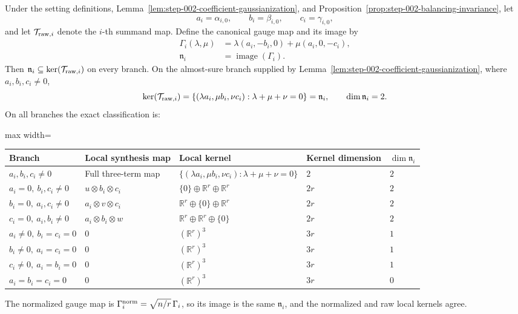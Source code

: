 \begin{lemma}
\label{lem:step-005-gauge-kernel}
Under the setting definitions, Lemma~\ref{lem:step-002-coefficient-gaussianization}, and Proposition~\ref{prop:step-002-balancing-invariance}, let
\[
  a_i=\alpha_{i,0},\qquad b_i=\beta_{i,0},\qquad c_i=\gamma_{i,0},
\]
and let \(\mathcal T_{{\rm raw},i}\) denote the \(i\)-th summand map. Define
the canonical gauge map and its image by
\[
\begin{aligned}
  \Gamma_i(\lambda,\mu)
  &=\lambda(a_i,-b_i,0)+\mu(a_i,0,-c_i),\\
  \mathfrak n_i&=\operatorname{image}(\Gamma_i).
\end{aligned}
\]
Then \(\mathfrak n_i\subseteq\ker(\mathcal T_{{\rm raw},i})\) on every
branch. On the almost-sure branch supplied by
Lemma~\ref{lem:step-002-coefficient-gaussianization}, where
\(a_i,b_i,c_i\ne0\),
\[
  \ker(\mathcal T_{{\rm raw},i})
  =\{(\lambda a_i,\mu b_i,\nu c_i):\lambda+\mu+\nu=0\}
  =\mathfrak n_i,\qquad \dim\mathfrak n_i=2.
\]
On all branches the exact classification is:

\begin{center}
\small
\begin{adjustbox}{max width=\textwidth}
\begin{tabular}{lllll}
\hline
Branch & Local synthesis map & Local kernel & Kernel dimension & \(\dim\mathfrak n_i\) \\
\hline
\(a_i,b_i,c_i\ne0\) & Full three-term map & \(\{(\lambda a_i,\mu b_i,\nu c_i):\lambda+\mu+\nu=0\}\) & \(2\) & \(2\) \\
\(a_i=0,\ b_i,c_i\ne0\) & \(u\otimes b_i\otimes c_i\) & \(\{0\}\oplus\mathbb R^r\oplus\mathbb R^r\) & \(2r\) & \(2\) \\
\(b_i=0,\ a_i,c_i\ne0\) & \(a_i\otimes v\otimes c_i\) & \(\mathbb R^r\oplus\{0\}\oplus\mathbb R^r\) & \(2r\) & \(2\) \\
\(c_i=0,\ a_i,b_i\ne0\) & \(a_i\otimes b_i\otimes w\) & \(\mathbb R^r\oplus\mathbb R^r\oplus\{0\}\) & \(2r\) & \(2\) \\
\(a_i\ne0,\ b_i=c_i=0\) & \(0\) & \((\mathbb R^r)^3\) & \(3r\) & \(1\) \\
\(b_i\ne0,\ a_i=c_i=0\) & \(0\) & \((\mathbb R^r)^3\) & \(3r\) & \(1\) \\
\(c_i\ne0,\ a_i=b_i=0\) & \(0\) & \((\mathbb R^r)^3\) & \(3r\) & \(1\) \\
\(a_i=b_i=c_i=0\) & \(0\) & \((\mathbb R^r)^3\) & \(3r\) & \(0\) \\
\hline
\end{tabular}
\end{adjustbox}
\end{center}

The normalized gauge map is
\(\Gamma_i^{\rm norm}=\sqrt{n/r}\,\Gamma_i\), so its image is the same
\(\mathfrak n_i\), and the normalized and raw local kernels agree.

\end{lemma}


